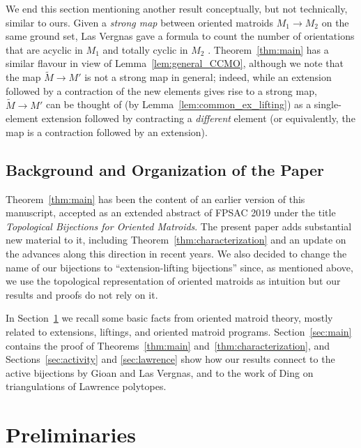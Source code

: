 \documentclass[12pt]{amsart}
\numberwithin{equation}{section}
\theoremstyle{definition}
\begin{document}
\medskip

We end this section mentioning another result conceptually, but not technically, similar to ours.
Given a {\em strong map} between oriented matroids $M_1\rightarrow M_2$ on the same ground set, Las Vergnas gave a formula to count the number of orientations that are acyclic in $M_1$ and totally cyclic in $M_2$ \cite{LV_ATCO}. Theorem~\ref{thm:main} has a similar flavour in view of Lemma~\ref{lem:general_CCMO}, although we note that the map $\widetilde{M}\rightarrow M'$ is not a strong map in general; 
indeed, while an extension followed by a contraction of the new elements gives rise to a strong map, $\widetilde{M}\rightarrow M'$ can be thought of (by Lemma~\ref{lem:common_ex_lifting}) as a single-element extension followed by contracting a {\em different} element (or equivalently, the map is a contraction followed by an extension).

\subsection{Background and Organization of the Paper}

Theorem~\ref{thm:main} has been the content of an earlier version of this manuscript, accepted as an extended abstract of FPSAC 2019 under the title {\em Topological Bijections for Oriented Matroids}.
The present paper adds substantial new material to it, including Theorem~\ref{thm:characterization} and an update on the advances along this direction in recent years. We also decided to change the name of our bijections to ``extension-lifting bijections'' since, as mentioned above, we use the topological representation of oriented matroids as intuition but our results and proofs do not rely on it.

In Section~\ref{sec:prelim} we recall some basic facts from oriented matroid theory, mostly related to extensions, liftings, and oriented matroid programs. Section~\ref{sec:main} contains the proof of Theorems~\ref{thm:main} and~\ref{thm:characterization}, and Sections~\ref{sec:activity} and \ref{sec:lawrence} show how our results connect to the active bijections by Gioan and Las Vergnas, and to the work of Ding on triangulations of Lawrence polytopes.

\section{Preliminaries}
\label{sec:prelim}
\end{document}
